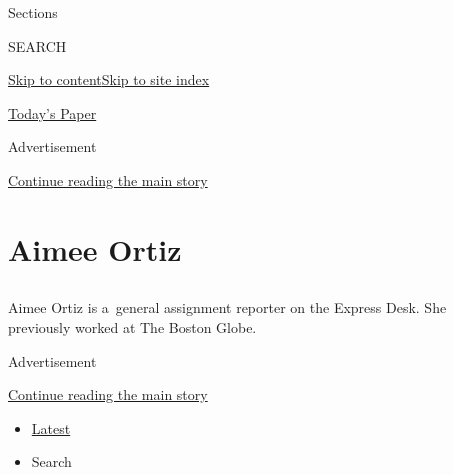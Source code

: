Sections

SEARCH

\protect\hyperlink{site-content}{Skip to
content}\protect\hyperlink{site-index}{Skip to site index}

\href{https://myaccount.nytimes3xbfgragh.onion/auth/login?response_type=cookie\&client_id=vi}{}

\href{https://www.nytimes3xbfgragh.onion/section/todayspaper}{Today's
Paper}

Advertisement

\protect\hyperlink{after-top}{Continue reading the main story}

\hypertarget{aimee-ortiz}{%
\section{Aimee Ortiz}\label{aimee-ortiz}}

\subsection{}

Aimee Ortiz is a~general assignment reporter on the Express Desk. She
previously worked at The Boston Globe.

Advertisement

\protect\hyperlink{after-mid1}{Continue reading the main story}

\begin{itemize}
\tightlist
\item
  \protect\hyperlink{stream-panel}{Latest}
\item
  Search
\end{itemize}

